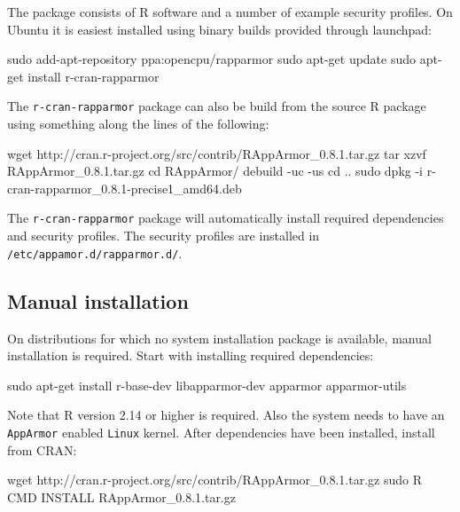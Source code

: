 \documentclass{jss}
\newcommand{\R}{\textsf{R}\xspace}
\newcommand{\AppArmor}{\texttt{AppArmor}\xspace}
\newcommand{\RAppArmor}{\pkg{RAppArmor}\xspace}
\newcommand{\Linux}{\texttt{Linux}\xspace}
\begin{document}
The \RAppArmor package consists of \R software and a number of example security
profiles. On Ubuntu it is easiest installed using binary builds provided through launchpad:

\begin{CodeChunk}
\begin{CodeInput}
sudo add-apt-repository ppa:opencpu/rapparmor
sudo apt-get update
sudo apt-get install r-cran-rapparmor
\end{CodeInput}
\end{CodeChunk}

The \texttt{r-cran-rapparmor} package can also be build from the source \R package
using something along the lines of the following:

\begin{CodeChunk}
\begin{CodeInput}
wget http://cran.r-project.org/src/contrib/RAppArmor_0.8.1.tar.gz
tar xzvf RAppArmor_0.8.1.tar.gz
cd RAppArmor/
debuild -uc -us
cd ..
sudo dpkg -i r-cran-rapparmor_0.8.1-precise1_amd64.deb
\end{CodeInput}
\end{CodeChunk}

The \texttt{r-cran-rapparmor} package will automatically install required
dependencies and security profiles. The security profiles are installed in
\texttt{/etc/appamor.d/rapparmor.d/}.

\subsection{Manual installation}

On distributions for which no system installation package is available, manual installation is required. Start with installing required dependencies:

\begin{CodeChunk}
\begin{CodeInput}
sudo apt-get install r-base-dev libapparmor-dev apparmor apparmor-utils
\end{CodeInput}
\end{CodeChunk}

Note that \R version 2.14 or higher is required. Also the system needs to have an \AppArmor enabled \Linux kernel. After dependencies have been installed, install \RAppArmor from CRAN:

\begin{CodeChunk}
\begin{CodeInput}
wget http://cran.r-project.org/src/contrib/RAppArmor_0.8.1.tar.gz
sudo R CMD INSTALL RAppArmor_0.8.1.tar.gz
\end{CodeInput}
\end{CodeChunk}
\end{document}
